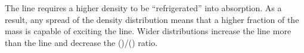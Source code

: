 The \formaldehyde \twotwo line requires a higher density to be ``refrigerated''
into absorption.  As a result, any spread of the density distribution means
that a higher fraction of the mass is capable of exciting the \twotwo line.
Wider distributions increase the \twotwo line more than the \oneone line and
decrease the (\oneone)/(\twotwo) ratio.  

%
%



